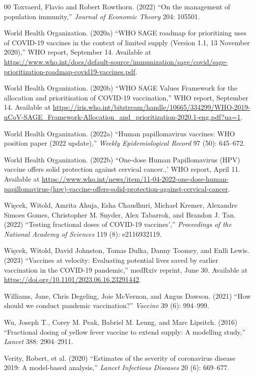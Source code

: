 \documentclass[12pt]{article}
\newcommand{\Wiecek}{Wi\k{e}cek}
\begin{document}
\begin{thebibliography}{00}
Toxvaerd, Flavio and Robert Rowthorn. (2022) ``On the management of
population immunity,'' {\em Journal of Economic Theory} 204: 105501.

World Health Organization. (2020a) ``WHO SAGE roadmap for prioritizing
uses of COVID-19 vaccines in the context of limited supply (Version
1.1, 13 November 2020),'' WHO report, September 14.  Available at
\url{https://www.who.int/docs/default-source/immunization/sage/covid/sage-prioritization-roadmap-covid19-vaccines.pdf}.

World Health Organization. (2020b) ``WHO SAGE Values Framework for the
allocation and prioritisation of COVID-19 vaccination,'' WHO report,
September 14. Available at
\url{https://iris.who.int/bitstream/handle/10665/334299/WHO-2019-nCoV-SAGE_Framework-Allocation_and_prioritization-2020.1-eng.pdf?ua=1}.

World Health Organization. (2022a) ``Human papillomavirus vaccines:
WHO position paper (2022 update),'' {\em Weekly Epidemiological
  Record} 97 (50): 645--672.

World Health Organization. (2022b) ``One-dose Human Papillomavirus
(HPV) vaccine offers solid protection against cervical cancer.,' WHO
report, April 11. Available at
\url{https://www.who.int/news/item/11-04-2022-one-dose-human-papillomavirus-(hpv)-vaccine-offers-solid-protection-against-cervical-cancer}.

\bibitem[\Wiecek\ et al.(2022)]{Wiecek2022}
\Wiecek, Witold, Amrita Ahuja, Esha Chaudhuri, Michael Kremer,
Alexandre Simoes Gomes, Christopher M. Snyder, Alex Tabarrok, and Brandon J. Tan. (2022) ``Testing fractional doses of COVID-19
vaccines’,'' {\em Proceedings of the National Academy of Sciences} 119
(8): e2116932119.

\bibitem[\Wiecek\ et al.(2023)]{Wiecek2023}
\Wiecek, Witold, David Johnston, Tomas Dulka, Danny Toomey, and Enlli
Lewis. (2023) ``Vaccines at velocity: Evaluating potential lives saved
by earlier vaccination in the COVID-19 pandemic,'' medRxiv reprint,
June 30. Available at \url{https://doi.org/10.1101/2023.06.16.23291442}.

Williams, Jane, Chris Degeling, Joie McVernon, and Angus
Dawson. (2021) ``How should we conduct pandemic vaccination?'' {\em
  Vaccine} 39 (6): 994--999.

Wu, Joseph T., Corey M. Peak, Babriel M. Leung, and Marc
Lipsitch. (2016) ``Fractional dosing of yellow fever vaccine to extend
supply: A modelling study,'' {\em Lancet} 388: 2904--2911.

Verity, Robert, et al. (2020) ``Estimates of the severity of
coronavirus disease 2019: A model-based analysis,'' {\em Lancet
  Infectious Diseases} 20 (6): 669--677.

\end{thebibliography}
\end{document}
